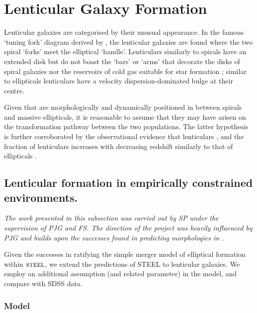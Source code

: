 \section{Lenticular Galaxy Formation}
Lenticular galaxies are categorised by their unusual appearance. In the famous `tuning fork' diagram derived by \citet{Hubble1927TheNebulae}, the lenticular galaxies are found where the two spiral `forks' meet the elliptical `handle'. Lenticulars similarly to spirals have an extended disk but do not boast the `bars' or `arms' that decorate the disks of spiral galaxies nor the reservoirs of cold gas suitable for star formation \cite{CHAMARAUX1986TheSamples}; similar to ellipticals lenticulars have a velocity dispersion-dominated bulge at their centre. 

Given that are morphologically and dynamically positioned in between spirals and massive ellipticals, it is reasonable to assume that they may have arisen on the transformation pathway between the two populations. The latter hypothesis is further corroborated by the observational evidence that lenticulars \cite{Dressler1980GalaxyGalaxies}, and the fraction of lenticulars increases with decreasing redshift similarly to that of ellipticals \cite{Postman2005TheClusters}. 

\subsection{Lenticular formation in empirically constrained environments.}
\textit{The work presented in this subsection was carried out by SP under the supervision of PJG and FS. The direction of the project was heavily influenced by PJG and builds upon the successes found in predicting morphologies in \steel.}

Given the successes in ratifying the simple merger model of elliptical formation within $\textsc{steel}$, we extend the predictions of STEEL to lenticular galaxies. We employ an additional assumption (and related parameter) in the model, and compare with SDSS data.

\subsubsection{\citet{Cook2009Two-phaseFormation} Model}

